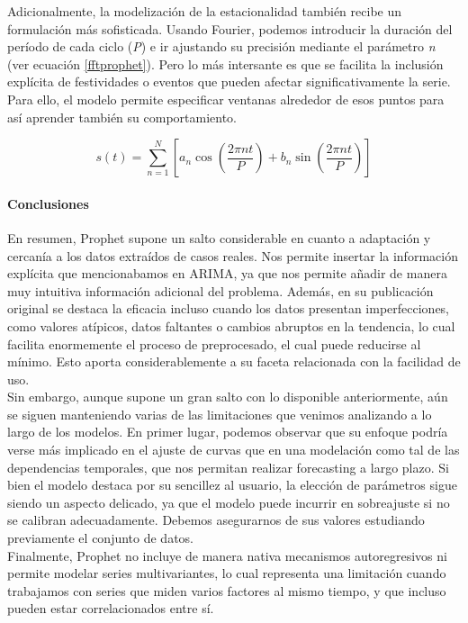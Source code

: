 Adicionalmente, la modelización de la estacionalidad también recibe un formulación más sofisticada. Usando Fourier, podemos introducir la duración del período de cada ciclo (\textit{P}) e ir ajustando su precisión mediante el parámetro \textit{n} (ver ecuación \ref{fftprophet}). Pero lo más intersante es que se facilita la inclusión explícita de festividades o eventos que pueden afectar significativamente la serie. Para ello, el modelo permite especificar ventanas alrededor de esos puntos para así aprender también su comportamiento.

\begin{equation}
	s(t) = \sum_{n=1}^{N} \left[ a_n \cos\left( \frac{2\pi n t}{P} \right) + b_n \sin\left( \frac{2\pi n t}{P} \right) \right]
	\label{fftprophet}
\end{equation}

\paragraph{Conclusiones}
\mbox{}

En resumen, Prophet supone un salto considerable en cuanto a adaptación y cercanía a los datos extraídos de casos reales. Nos permite insertar la información explícita que mencionabamos en ARIMA, ya que nos permite añadir de manera muy intuitiva información adicional del problema. Además, en su publicación original se destaca la eficacia incluso cuando los datos presentan imperfecciones, como valores atípicos, datos faltantes o cambios abruptos en la tendencia, lo cual facilita enormemente el proceso de preprocesado, el cual puede reducirse al mínimo. Esto aporta considerablemente a su faceta relacionada con la facilidad de uso.\\

Sin embargo, aunque supone un gran salto con lo disponible anteriormente, aún se siguen manteniendo varias de las limitaciones que venimos analizando a lo largo de los modelos. En primer lugar, podemos observar que su enfoque podría verse más implicado en el ajuste de curvas que en una modelación como tal de las dependencias temporales, que nos permitan realizar forecasting a largo plazo. Si bien el modelo destaca por su sencillez al usuario, la elección de parámetros sigue siendo un aspecto delicado, ya que el modelo puede incurrir en sobreajuste si no se calibran adecuadamente. Debemos asegurarnos de sus valores estudiando previamente el conjunto de datos.\\

 Finalmente, Prophet no incluye de manera nativa mecanismos autoregresivos ni permite modelar series multivariantes, lo cual representa una limitación cuando trabajamos con series que miden varios factores al mismo tiempo, y que incluso pueden estar correlacionados entre sí.

